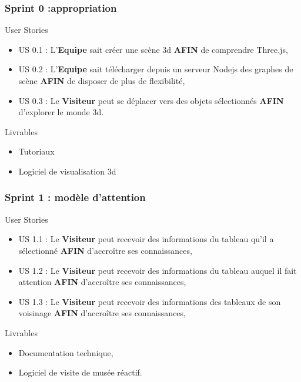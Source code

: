 \documentclass[11pt]{beamer}
\begin{document}
\begin{frame}
\frametitle{Sprint 0 :appropriation}
\begin{block}{User Stories}
\begin{itemize}
	\item 	US 0.1 : L'{\bf Equipe} sait créer une scène 3d {\bf AFIN} de  comprendre Three.js,
	\item 	US 0.2 : L'{\bf Equipe} sait télécharger depuis un serveur Nodejs des graphes de scène {\bf AFIN} de disposer de plus de flexibilité,
	\item 	US 0.3 : Le {\bf Visiteur } peut se déplacer vers des objets sélectionnés {\bf AFIN} d'explorer le monde 3d.
\end{itemize}
\end{block}

\begin{block}{Livrables}
	\begin{itemize}
		\item Tutoriaux
		\item Logiciel de visualisation 3d
	\end{itemize}
\end{block}
\end{frame}

\begin{frame}
\frametitle{Sprint 1 : modèle d'attention}
\begin{block}{User Stories}
	\begin{itemize}
	\item 	US 1.1 : Le {\bf Visiteur} peut recevoir des informations du tableau qu'il a sélectionné {\bf AFIN}  d'accroître ses connaissances,
\item 	US 1.2 : Le {\bf Visiteur} peut recevoir des informations du tableau auquel il fait attention {\bf AFIN} d'accroître ses connaissances,

\item 	US 1.3 : Le {\bf Visiteur } peut recevoir des informations des tableaux de son voisinage {\bf AFIN} d'accroître ses connaissances,
	\end{itemize}
\end{block}

\begin{block}{Livrables}
	\begin{itemize}
		\item Documentation technique,
		\item Logiciel de visite de musée réactif.
	\end{itemize}
\end{block}
\end{frame}
\end{document}
